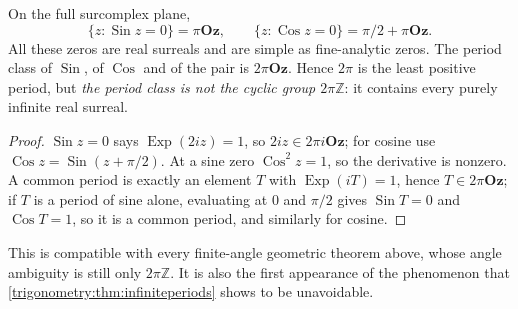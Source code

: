 \documentclass[11pt,letterpaper]{article}
\numberwithin{equation}{section}
\theoremstyle{definition}
\theoremstyle{remark}
\newcommand{\Oz}{\mathbf{Oz}}
\newcommand{\Z}{\mathbb Z}
\newcommand{\Exp}{\operatorname{Exp}}
\newcommand{\Sin}{\operatorname{Sin}}
\newcommand{\Cos}{\operatorname{Cos}}
\begin{document}
\begin{corollary}\label{trigonometry:cor:globalzeros}
On the full surcomplex plane,
\[
 \{z:\Sin z=0\}=\pi\Oz,\qquad \{z:\Cos z=0\}=\pi/2+\pi\Oz .
\]
All these zeros are real surreals and are simple as fine-analytic zeros. The period class of
$\Sin$, of $\Cos$ and of the pair is $2\pi\Oz$. Hence $2\pi$ is the least positive period, but
\emph{the period class is not the cyclic group $2\pi\Z$}: it contains every purely infinite real
surreal.
\end{corollary}
\begin{proof}
$\Sin z=0$ says $\Exp(2iz)=1$, so $2iz\in2\pi i\Oz$; for cosine use $\Cos z=\Sin(z+\pi/2)$. At a
sine zero $\Cos^2z=1$, so the derivative is nonzero. A common period is exactly an element $T$ with
$\Exp(iT)=1$, hence $T\in2\pi\Oz$; if $T$ is a period of sine alone, evaluating at $0$ and $\pi/2$
gives $\Sin T=0$ and $\Cos T=1$, so it is a common period, and similarly for cosine.
\end{proof}
This is compatible with every finite-angle geometric theorem above, whose angle ambiguity is still
only $2\pi\Z$. It is also the first appearance of the phenomenon that
\cref{trigonometry:thm:infiniteperiods} shows to be unavoidable.
\end{document}
